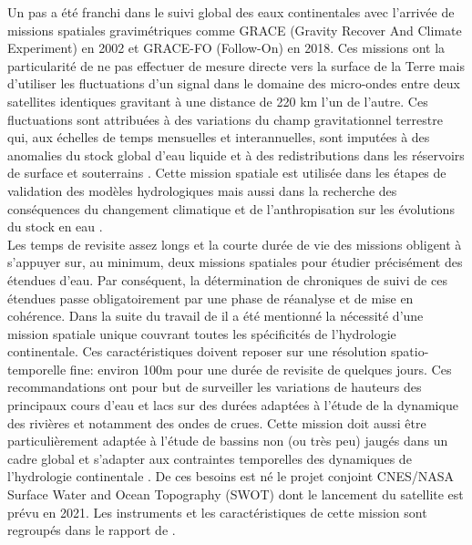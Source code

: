 Un pas a été franchi dans le suivi global des eaux continentales avec l'arrivée de missions spatiales gravimétriques comme GRACE (Gravity Recover And Climate Experiment) en 2002 et GRACE-FO (Follow-On) en 2018. Ces missions ont la particularité de ne pas effectuer de mesure directe vers la surface de la Terre mais d'utiliser les fluctuations d'un signal dans le domaine des micro-ondes entre deux satellites identiques gravitant à une distance de 220 km l'un de l'autre. Ces fluctuations sont attribuées à des  variations du champ gravitationnel terrestre qui, aux échelles de temps mensuelles et interannuelles, sont imputées à des anomalies du stock global d'eau liquide et à des redistributions dans les réservoirs de surface et souterrains \citep{tapley2004}. Cette mission spatiale est utilisée dans les étapes de validation des modèles hydrologiques \citep{niu2006} mais aussi dans la recherche des conséquences du changement climatique et de l'anthropisation sur les évolutions du stock en eau \citep{rodell2018}.\\

Les temps de revisite assez longs et la courte durée de vie des missions obligent à s'appuyer sur, au minimum, deux missions spatiales pour étudier précisément des étendues d'eau. Par conséquent, la détermination de chroniques de suivi de ces étendues passe obligatoirement par une phase de réanalyse et de mise en cohérence. Dans la suite du travail de \citet{alsdorf2003} il a été mentionné la nécessité d'une mission spatiale unique couvrant toutes les spécificités de l'hydrologie continentale. Ces caractéristiques doivent reposer sur une résolution spatio-temporelle fine: environ 100m pour une durée de revisite de quelques jours. Ces recommandations ont pour but de surveiller les variations de hauteurs des principaux cours d'eau et lacs sur des durées adaptées à l'étude de la dynamique des rivières et notamment des ondes de crues. Cette mission doit aussi être particulièrement adaptée à l'étude de bassins non (ou très peu) jaugés dans un cadre global et s'adapter aux contraintes temporelles des dynamiques de l'hydrologie continentale \citep{alsdorf2007}. De ces besoins est né le projet conjoint CNES/NASA Surface Water and Ocean Topography (SWOT) dont le lancement du satellite est prévu en 2021. Les instruments et les caractéristiques de cette mission sont regroupés dans le rapport de \citet{fu2012}.\\


